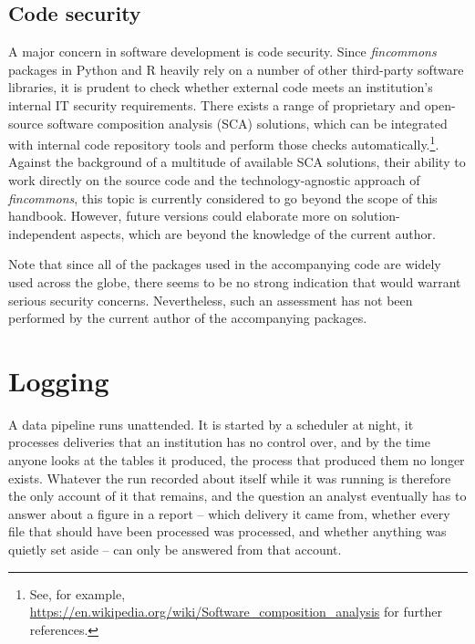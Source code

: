 \documentclass[a4paper, 11pt]{report}
\begin{document}
\subsection{Code security}

A major concern in software development is code security. Since \emph{fincommons} packages in Python and R heavily rely on a number of other third-party software libraries, it is prudent to check whether external code meets an institution's internal IT security requirements. There exists a range of proprietary and open-source software composition analysis (SCA) solutions, which can be integrated with internal code repository tools and perform those checks automatically.\footnote{See, for example, \url{https://en.wikipedia.org/wiki/Software_composition_analysis} for further references.}. Against the background of a multitude of available SCA solutions, their ability to work directly on the source code and the technology-agnostic approach of \emph{fincommons}, this topic is currently considered to go beyond the scope of this handbook. However, future versions could elaborate more on solution-independent aspects, which are beyond the knowledge of the current author.

Note that since all of the packages used in the accompanying code are widely used across the globe, there seems to be no strong indication that would warrant serious security concerns. Nevertheless, such an assessment has not been performed by the current author of the accompanying packages.



\section{Logging\label{sec:intro-logging}}

A data pipeline runs unattended. It is started by a scheduler at night, it processes deliveries that an institution has no control over, and by the time anyone looks at the tables it produced, the process that produced them no longer exists. Whatever the run recorded about itself while it was running is therefore the only account of it that remains, and the question an analyst eventually has to answer about a figure in a report -- which delivery it came from, whether every file that should have been processed was processed, and whether anything was quietly set aside -- can only be answered from that account.
\end{document}

